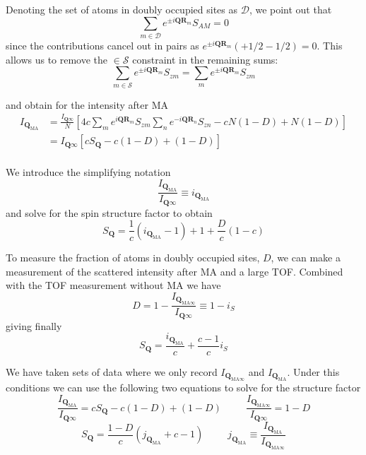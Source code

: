 \documentclass[11pt,letter]{article}
\newcommand{\bv}[1]{\ensuremath{\bm{#1}}}
\newcommand{\Iqtof}{\ensuremath{I_{\bv{Q}\infty} }}
\newcommand{\Iqma}{\ensuremath{I_{\bv{Q}_{\text{MA}}} }}
\newcommand{\iqma}{\ensuremath{i_{\bv{Q}_{\text{MA}}} }}
\newcommand{\jqma}{\ensuremath{j_{\bv{Q}_{\text{MA}}} }}
\newcommand{\Iqmatof}{\ensuremath{I_{\bv{Q}_{\text{MA}\infty}} }}
\newcommand{\is}{\ensuremath{i_{S}} }
\begin{document}
Denoting the set of atoms in doubly occupied sites as $\mathcal{D}$, we point
out that 
\begin{equation}
 \sum_{m \in \mathcal{D} }  e^{ \pm i \bv{Q} \bv{R}_{m}} S_{AM} = 0 
\end{equation}
since the contributions cancel out in pairs as $   e^{ \pm i \bv{Q} \bv{R}_{m}}
( +1/2 - 1/2 ) = 0 $.  This allows us to remove the $\in \mathcal{S}$
constraint in the remaining sums: 
\begin{equation}
 \sum_{m \in \mathcal{S} }  e^{ \pm i \bv{Q} \bv{R}_{m}} S_{zm} = 
 \sum_{m}  e^{ \pm i \bv{Q} \bv{R}_{m}} S_{zm}  
\end{equation}

and obtain for the intensity after MA 
\begin{equation}
\begin{split} 
 \Iqma
&  = \frac{ \Iqtof }{N} 
  \left[ 
      4 c \sum_{m}  
      e^{ i \bv{Q} \bv{R}_{m} } S_{zm} 
      \sum_{n } 
      e^{ -i \bv{Q} \bv{R}_{n} } S_{zn} 
    -  c N(1-D)  + N(1-D) 
   \right]  \\ 
&  =  \Iqtof 
  \left[ c S_{\bv{Q}}
    -  c (1-D)  + (1-D) 
   \right]  \\ 
\end{split}
\end{equation}

We introduce the simplifying notation
\begin{equation}
 \frac{  \Iqma } { \Iqtof } \equiv \iqma  
\end{equation}
and solve for the spin structure factor to obtain
\begin{equation}
S_{\bv{Q}} = \frac{1}{c}\left( \iqma  - 1 \right)
             + 1 + \frac{D}{c}(1-c) 
\end{equation}

To measure the fraction of atoms in doubly occupied sites, $D$, we can make a
measurement of the scattered intensity after MA and a large TOF.  Combined with
the TOF measurement without MA we have 
\begin{equation}
  D = 1 - \frac{\Iqmatof }{ \Iqtof } \equiv 1 - \is 
\end{equation} 
giving finally 
\begin{equation}
S_{\bv{Q}} = \frac{\iqma}{c} + \frac{c-1}{c} \is 
\end{equation}

We have taken sets of data where we only record $\Iqmatof$ and $\Iqma$. Under
this conditions we can use the following two equations to solve for the
structure factor
\begin{equation} 
\frac{\Iqma }{\Iqtof}  = cS_{\bv{Q}} - c(1-D) + (1-D)
\ \ \ \ \ \ \ \ \ \ \ 
\frac{ \Iqmatof }{\Iqtof}  =  1 -D 
\end{equation} 
\begin{equation}
S_{\bv{Q}} = \frac{1-D}{c} ( \jqma + c - 1 )  
\ \ \ \ \ \ \ \ \ \ \ 
\jqma \equiv  \frac{\Iqma}{\Iqmatof} 
\end{equation}
\end{document}
